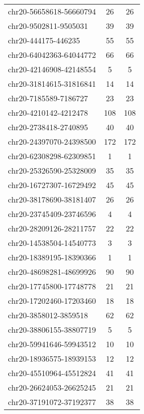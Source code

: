 \begin{longtable}{lSS}
	chr20-56658618-56660794 & 26     & 26                         \\
	chr20-9502811-9505031   & 39     & 39                         \\
	chr20-444175-446235     & 55     & 55                         \\
	chr20-64042363-64044772 & 66     & 66                         \\
	chr20-42146908-42148554 & 5      & 5                          \\
	chr20-31814615-31816841 & 14     & 14                         \\
	chr20-7185589-7186727   & 23     & 23                         \\
	chr20-4210142-4212478   & 108    & 108                        \\
	chr20-2738418-2740895   & 40     & 40                         \\
	chr20-24397070-24398500 & 172    & 172                        \\
	chr20-62308298-62309851 & 1      & 1                          \\
	chr20-25326590-25328009 & 35     & 35                         \\
	chr20-16727307-16729492 & 45     & 45                         \\
	chr20-38178690-38181407 & 26     & 26                         \\
	chr20-23745409-23746596 & 4      & 4                          \\
	chr20-28209126-28211757 & 22     & 22                         \\
	chr20-14538504-14540773 & 3      & 3                          \\
	chr20-18389195-18390366 & 1      & 1                          \\
	chr20-48698281-48699926 & 90     & 90                         \\
	chr20-17745800-17748778 & 21     & 21                         \\
	chr20-17202460-17203460 & 18     & 18                         \\
	chr20-3858012-3859518   & 62     & 62                         \\
	chr20-38806155-38807719 & 5      & 5                          \\
	chr20-59941646-59943512 & 10     & 10                         \\
	chr20-18936575-18939153 & 12     & 12                         \\
	chr20-45510964-45512824 & 41     & 41                         \\
	chr20-26624053-26625245 & 21     & 21                         \\
	chr20-37191072-37192377 & 38     & 38                         \\
\end{longtable}

